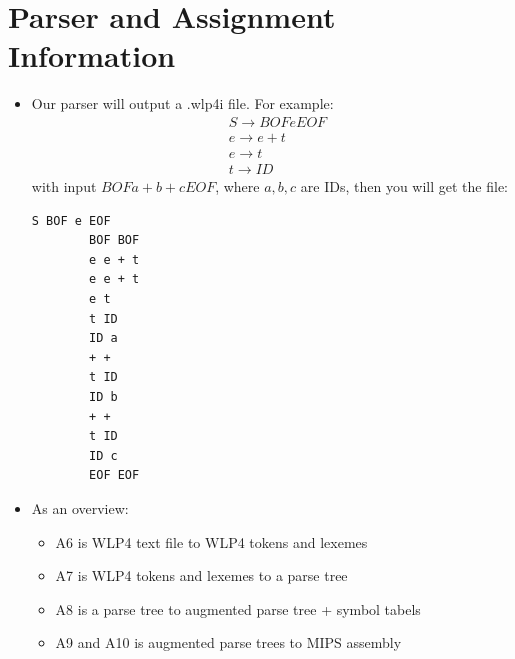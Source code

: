 \documentclass[12pt]{article}
\begin{document}
\section{Parser and Assignment Information}
\begin{itemize}
    \item Our parser will output a .wlp4i file.  For example:
        \begin{align*}
            &S \rightarrow BOF e EOF \\
            &e \rightarrow e + t \\
            &e \rightarrow t \\
            &t \rightarrow ID
        \end{align*}
        with input $BOF a + b + c EOF$, where $a, b, c$ are IDs, then you will get the file:
        \begin{lstlisting}[mathescape, numbers=none, breaklines=true]
        S BOF e EOF
        BOF BOF
        e e + t
        e e + t
        e t
        t ID
        ID a
        + +
        t ID
        ID b
        + +
        t ID
        ID c
        EOF EOF
        \end{lstlisting}
    \item As an overview:
        \begin{itemize}
            \item A6 is WLP4 text file to WLP4 tokens and lexemes
            \item A7 is WLP4 tokens and lexemes to a parse tree
            \item A8 is a parse tree to augmented parse tree + symbol tabels
            \item A9 and A10 is augmented parse trees to MIPS assembly
        \end{itemize}
\end{itemize}
\end{document}

